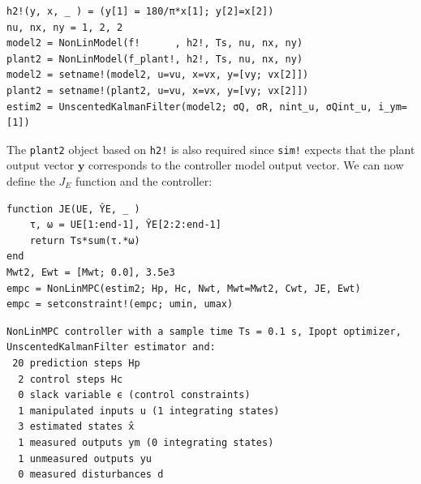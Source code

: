 \begin{verbatim}
h2!(y, x, _ ) = (y[1] = 180/π*x[1]; y[2]=x[2])
nu, nx, ny = 1, 2, 2
model2 = NonLinModel(f!      , h2!, Ts, nu, nx, ny)
plant2 = NonLinModel(f_plant!, h2!, Ts, nu, nx, ny)
model2 = setname!(model2, u=vu, x=vx, y=[vy; vx[2]])
plant2 = setname!(plant2, u=vu, x=vx, y=[vy; vx[2]])
estim2 = UnscentedKalmanFilter(model2; σQ, σR, nint_u, σQint_u, i_ym=[1])
\end{verbatim}
The \texttt{plant2} object based on \texttt{h2!} is also required since \texttt{sim!} expects that the plant output vector $\mathbf{y}$ corresponds to the controller model output vector. We can now define the $J_E$ function and the controller:
\begin{verbatim}
function JE(UE, ŶE, _ )
    τ, ω = UE[1:end-1], ŶE[2:2:end-1]
    return Ts*sum(τ.*ω)
end
Mwt2, Ewt = [Mwt; 0.0], 3.5e3
empc = NonLinMPC(estim2; Hp, Hc, Nwt, Mwt=Mwt2, Cwt, JE, Ewt)
empc = setconstraint!(empc; umin, umax)
\end{verbatim}
\spacerepl
\begin{verbatim}
NonLinMPC controller with a sample time Ts = 0.1 s, Ipopt optimizer, 
UnscentedKalmanFilter estimator and:
 20 prediction steps Hp
  2 control steps Hc
  0 slack variable ϵ (control constraints)
  1 manipulated inputs u (1 integrating states)
  3 estimated states x̂
  1 measured outputs ym (0 integrating states)
  1 unmeasured outputs yu
  0 measured disturbances d
\end{verbatim}

